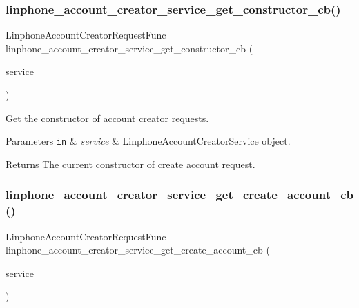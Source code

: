 \subsubsection{linphone\+\_\+account\+\_\+creator\+\_\+service\+\_\+get\+\_\+constructor\+\_\+cb()}
{\footnotesize\ttfamily Linphone\+Account\+Creator\+Request\+Func linphone\+\_\+account\+\_\+creator\+\_\+service\+\_\+get\+\_\+constructor\+\_\+cb (\begin{DoxyParamCaption}\item[{const \textbf{ Linphone\+Account\+Creator\+Service} $\ast$}]{service }\end{DoxyParamCaption})}



Get the constructor of account creator requests. 


\begin{DoxyParams}[1]{Parameters}
\mbox{\tt in}  & {\em service} & Linphone\+Account\+Creator\+Service object. \\
\hline
\end{DoxyParams}
\begin{DoxyReturn}{Returns}
The current constructor of create account request.  
\end{DoxyReturn}
\mbox{\label{group__account__creator__request_gaf74aa9398e6cd45224e86e747160a714}} 
\subsubsection{linphone\+\_\+account\+\_\+creator\+\_\+service\+\_\+get\+\_\+create\+\_\+account\+\_\+cb()}
{\footnotesize\ttfamily Linphone\+Account\+Creator\+Request\+Func linphone\+\_\+account\+\_\+creator\+\_\+service\+\_\+get\+\_\+create\+\_\+account\+\_\+cb (\begin{DoxyParamCaption}\item[{const \textbf{ Linphone\+Account\+Creator\+Service} $\ast$}]{service }\end{DoxyParamCaption})}




